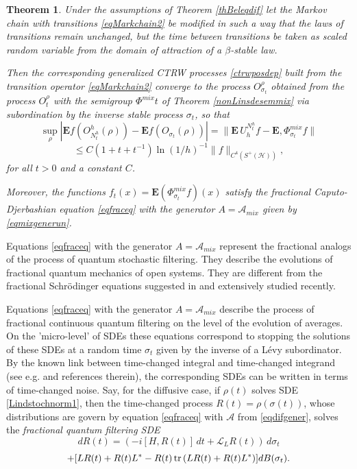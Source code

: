 \documentclass[12pt]{article}
\def\AC{\mathcal{A}}
\def\LC{\mathcal{L}}
\def\HC{\mathcal{H}}
\def\E{\mathbf{E}}
\def\tr{\rm{tr}}
\def\be{\beta}
\newtheorem{theorem}{Theorem}[section]
\newcommand{\si}{\sigma}
\begin{document}
 \begin{theorem}
 \label{mainth}
 Under the assumptions of Theorem \ref{thBeleqdif} let the Markov chain with transitions \eqref{eqMarkchain2}
be modified in such a way that the laws of transitions remain unchanged, but the time between transitions be
taken as scaled random variable from the domain
of attraction of a $\be$-stable law.

Then the corresponding generalized CTRW processes \eqref{ctrwposdep}
  built from the transition operator
\eqref{eqMarkchain2} converge to the process $O^{\rho}_{\si_t}$ obtained from the process
$O^{\rho}_t$  with the semigroup $\Phi^{mix}t$  of Theorem \ref{nonLinsdesemmix} via subordination by the inverse stable process
$\si_t$, so that
\[
\sup_\rho|\E f( O^h_{N_t^h}(\rho))-\E f (O_{\si_t}(\rho))|
=\|\E \, U_h^{N_t^h}f - \E , \Phi^{mix}_{\si_t}f\|
\]
\begin{equation}
\label{eq0CTRWrates}
\le C (1+t+t^{-1}) \ln (1/h)^{-1}  \|f\|_{C^4(S^+(\HC))},
\end{equation}
for all $t>0$ and a constant $C$.

Moreover, the functions $f_t(x)=\E (\Phi^{mix}_{\si_t}f)(x)$
satisfy the fractional Caputo-Djerbashian equation
\eqref{eqfraceq} with the generator $A=\AC_{mix}$ given by \eqref{eqmixgenerun}.
 \end{theorem}

Equations \eqref{eqfraceq} with the generator $A=\AC_{mix}$
represent the fractional analogs of the process of quantum stochastic filtering. They
describe the evolutions of fractional quantum mechanics of open systems.
They are different from the fractional
Schr\"odinger equations suggested in  \cite{Lask02} and extensively studied recently.

Equations \eqref{eqfraceq} with the generator $A=\AC_{mix}$
 describe the process of fractional continuous quantum filtering on the level
of the evolution of averages. On the 'micro-level' of SDEs these equations correspond
to stopping the solutions of these SDEs at a random time $\si_t$ given by the inverse of a L\'evy subordinator.
By the known link between time-changed integral and time-changed integrand (see e.g. \cite{Koba} and references therein),
the corresponding SDEs can be written in terms of time-changed noise. Say,
for the diffusive case, if $\rho(t)$ solves SDE \eqref{Lindstochnorm1}, then the time-changed
process $R(t)=\rho(\si(t))$, whose distributions are govern by equation \eqref{eqfraceq}
with $\AC$ from \eqref{eqdifgener}, solves the {\it fractional quantum filtering SDE}
\[
dR(t)= \left(-i[H,R(t)]\, dt+\LC_L R (t)\right)\, d\si_t
\]
\begin{equation}
\label{Lindstochnormfrac}
+[LR(t)+R(t) L^*-R(t)\, {\tr} \, (LR(t)+R(t) L^*) ] dB(\si_t).
\end{equation}
\end{document}
